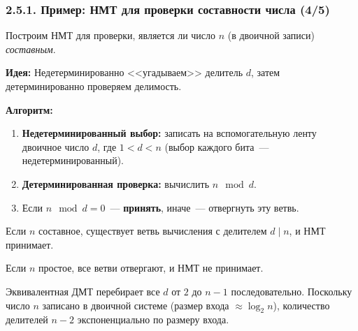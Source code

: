 \documentclass[mathserif,12pt,aspectratio=169]{beamer}
\def\NB#1{{\bf\color{brown}#1}}
\begin{document}
\begin{frame}
\frametitle{2.5.1. Пример: НМТ для проверки составности числа (4/5)}

\begin{example}
Построим НМТ для проверки, является ли число $n$ (в двоичной записи) \emph{составным}.

\NB{Идея:} Недетерминированно <<угадываем>> делитель $d$, затем 
детерминированно проверяем делимость.

\NB{Алгоритм:}
\begin{enumerate}
\item \textbf{Недетерминированный выбор:} записать на вспомогательную ленту 
      двоичное число $d$, где $1 < d < n$ (выбор каждого бита~--- недетерминированный).
\item \textbf{Детерминированная проверка:} вычислить $n \mod d$.
\item Если $n \mod d = 0$~--- \textbf{принять}, иначе~--- отвергнуть эту ветвь.
\end{enumerate}

Если $n$ составное, существует ветвь вычисления с делителем $d \mid n$, и НМТ принимает.

Если $n$ простое, все ветви отвергают, и НМТ не принимает.
\end{example}

\begin{remark}
Эквивалентная ДМТ перебирает все $d$ от $2$ до $n-1$ последовательно.
Поскольку число $n$ записано в двоичной системе (размер входа $\approx \log_2 n$),
количество делителей $n - 2$ экспоненциально по размеру входа.
\end{remark}

\end{frame}
\end{document}
